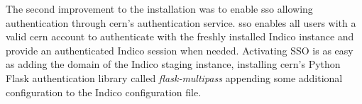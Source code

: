 The second improvement to the installation was to enable \gls{sso} allowing authentication through \gls{cern}'s authentication service. \gls{sso} enables all users with a valid \gls{cern} account to authenticate with the freshly installed Indico instance and provide an authenticated Indico session when needed. Activating SSO is as easy as adding the domain of the Indico staging instance, installing \gls{cern}'s Python Flask authentication library called \textit{flask-multipass} \cite{flask-multipass} appending some additional configuration to the Indico configuration file.
